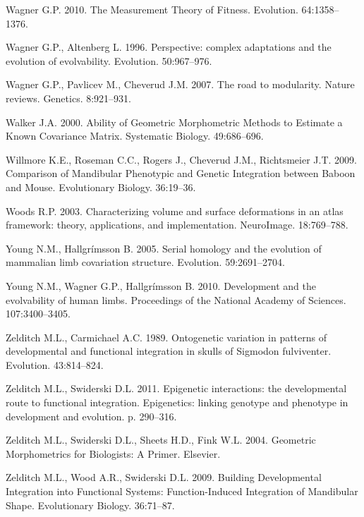 \documentclass[12pt,]{article}
\begin{document}
Wagner G.P. 2010. The Measurement Theory of Fitness. Evolution.
64:1358--1376.

Wagner G.P., Altenberg L. 1996. Perspective: complex adaptations and the
evolution of evolvability. Evolution. 50:967--976.

Wagner G.P., Pavlicev M., Cheverud J.M. 2007. The road to modularity.
Nature reviews. Genetics. 8:921--931.

Walker J.A. 2000. Ability of Geometric Morphometric Methods to Estimate
a Known Covariance Matrix. Systematic Biology. 49:686--696.

Willmore K.E., Roseman C.C., Rogers J., Cheverud J.M., Richtsmeier J.T.
2009. Comparison of Mandibular Phenotypic and Genetic Integration
between Baboon and Mouse. Evolutionary Biology. 36:19--36.

Woods R.P. 2003. Characterizing volume and surface deformations in an
atlas framework: theory, applications, and implementation. NeuroImage.
18:769--788.

Young N.M., Hallgrímsson B. 2005. Serial homology and the evolution of
mammalian limb covariation structure. Evolution. 59:2691--2704.

Young N.M., Wagner G.P., Hallgrímsson B. 2010. Development and the
evolvability of human limbs. Proceedings of the National Academy of
Sciences. 107:3400--3405.

Zelditch M.L., Carmichael A.C. 1989. Ontogenetic variation in patterns
of developmental and functional integration in skulls of Sigmodon
fulviventer. Evolution. 43:814--824.

Zelditch M.L., Swiderski D.L. 2011. Epigenetic interactions: the
developmental route to functional integration. Epigenetics: linking
genotype and phenotype in development and evolution. p. 290--316.

Zelditch M.L., Swiderski D.L., Sheets H.D., Fink W.L. 2004. Geometric
Morphometrics for Biologists: A Primer. Elsevier.

Zelditch M.L., Wood A.R., Swiderski D.L. 2009. Building Developmental
Integration into Functional Systems: Function-Induced Integration of
Mandibular Shape. Evolutionary Biology. 36:71--87.
\end{document}
